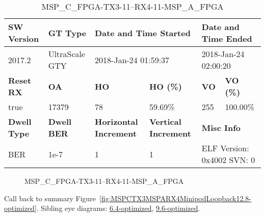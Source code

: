 \begin{table}[h]
\centering
\caption{MSP\_C\_FPGA-TX3-11--RX4-11-MSP\_A\_FPGA}
\label{tab:MSPCFPGATX311RX411MSPAFPGA12.8-optimized}
\begin{tabular}{@{}|l|l|l|l|l|l|@{}}
\toprule
\textbf{SW Version}                & \textbf{GT Type}   & \multicolumn{2}{l|}{\textbf{Date and Time Started}}            & \multicolumn{2}{l|}{\textbf{Date and Time Ended}}        \\ \midrule
2017.2                       & UltraScale GTY          & \multicolumn{2}{l|}{2018-Jan-24 01:59:37}                   & \multicolumn{2}{l|}{2018-Jan-24 02:00:20}               \\ \midrule
\textbf{Reset RX}                  & \textbf{OA} & \textbf{HO}   & \textbf{HO (\%)} & \textbf{VO} & \textbf{VO (\%)} \\ \midrule
true & 17379        & 78          & 59.69\%        & 255        & 100.00\%       \\ \midrule
\textbf{Dwell Type}                & \textbf{Dwell BER} & \textbf{Horizontal Increment} & \textbf{Vertical Increment}    & \multicolumn{2}{l|}{\textbf{Misc Info}}                  \\ \midrule
BER                            & 1e-7        & 1        & 1           & \multicolumn{2}{l|}{ELF Version: 0x4002 SVN: 0}                         \\ \bottomrule
\end{tabular}
\end{table}

\begin{figure}[h]
\caption{MSP\_C\_FPGA-TX3-11--RX4-11-MSP\_A\_FPGA} \label{fig:MSPCFPGATX311RX411MSPAFPGA12.8-optimized}
\end{figure}

Call back to summary Figure~\ref{fig:MSPCTX3MSPARX4MinipodLoopback12.8-optimized}.
Sibling eye diagrams: \hyperref[sec:MSPCFPGATX311RX411MSPAFPGA6.4-optimized]{6.4-optimized}, \hyperref[sec:MSPCFPGATX311RX411MSPAFPGA9.6-optimized]{9.6-optimized}.

\clearpage
\newpage

